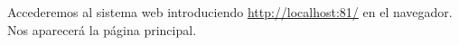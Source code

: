 \documentclass[12pt, twoside]{report}
\begin{document}

Accederemos al sistema web introduciendo \hyperlink{http://localhost:81/}{http://localhost:81/} en el navegador. Nos aparecerá la página principal.\\
\end{document}
